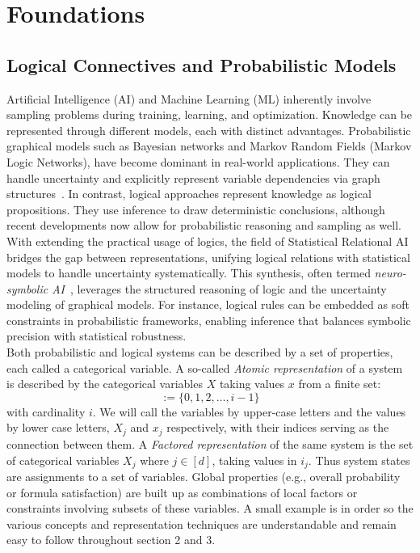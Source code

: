 \documentclass[encoding=utf8,british]{tumphthesis}
\begin{document}
\chapter{Foundations}
    \section{Logical Connectives and Probabilistic Models}
    \label{sect:Foundations_modelling}
        Artificial Intelligence (AI) and Machine Learning (ML) inherently involve sampling problems during training, learning, and optimization. 
        Knowledge can be represented through different models, each with distinct advantages. Probabilistic graphical models such as Bayesian 
        networks and Markov Random Fields (Markov Logic Networks), have become dominant in real-world applications. They can handle uncertainty and explicitly
        represent variable dependencies via graph structures~\cite{NumberAnalytics2025}. In contrast, logical approaches represent knowledge as logical 
        propositions. They use inference to draw deterministic conclusions, although recent developments now allow for probabilistic reasoning and sampling as well.
        \\
        With extending the practical usage of logics, the field of Statistical Relational AI bridges the gap between representations, unifying logical relations with statistical 
        models to handle uncertainty systematically. This synthesis, often termed \textit{neuro-symbolic AI}~\cite{Toward_a_broad_AI}, leverages the 
        structured reasoning of logic and the uncertainty modeling of graphical models. For instance, logical rules can be embedded as soft constraints in probabilistic 
        frameworks, enabling inference that balances symbolic precision with statistical robustness.
        \\
        Both probabilistic and logical systems can be described by a set of properties, each called a categorical variable. A so-called \textit{Atomic representation}
        of a system is described by the categorical variables $X$ taking values $x$ from a finite set:
        \begin{equation*}
            [i] := \{0,1,2,\dots, i-1\} 
        \end{equation*} 
        with cardinality $i$. We will call the variables by upper-case letters and the values by lower case letters, $X_j$ and $x_j$ respectively, with their indices serving as the connection between them.
        A \textit{Factored representation} of the same system is the set of categorical variables $X_j$ where $j \in [d]$, taking values in $i_j$. Thus system states are assignments to a set of variables. 
        Global properties (e.g., overall probability or formula satisfaction) are built up as combinations of local factors or constraints involving subsets 
        of these variables. 
        A small example is in order so the various concepts and representation techniques are understandable and remain easy to follow throughout section 2 and 3. 
\end{document}
